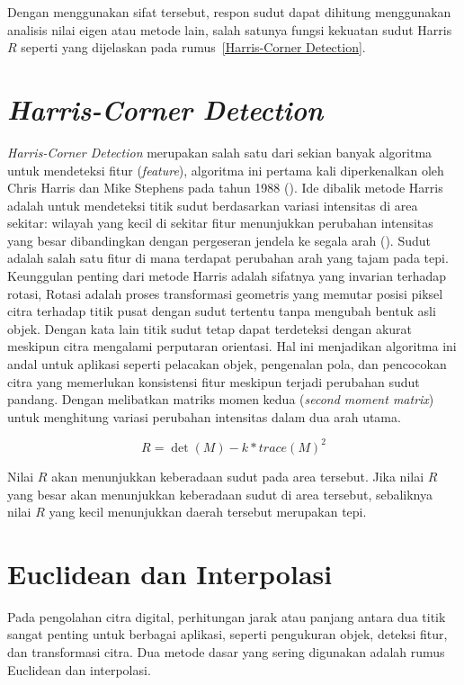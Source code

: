 Dengan menggunakan sifat tersebut, respon sudut dapat dihitung menggunakan analisis nilai eigen atau metode lain, salah satunya fungsi kekuatan sudut Harris \(R\) seperti yang dijelaskan pada rumus~\ref{Harris-Corner Detection}.

\section{\emph{Harris-Corner Detection}}
  \emph{Harris-Corner Detection} merupakan salah satu dari sekian banyak algoritma untuk mendeteksi fitur (\emph{feature}), algoritma ini pertama kali diperkenalkan oleh Chris Harris dan Mike Stephens pada tahun 1988 (\cite{Harris2013}). 
Ide dibalik metode Harris adalah untuk mendeteksi titik sudut berdasarkan variasi intensitas di area sekitar: wilayah yang kecil di sekitar fitur menunjukkan perubahan intensitas yang besar dibandingkan dengan pergeseran jendela ke segala arah (\cite[hlm. 305--308]{Sanchez2018}).
Sudut adalah salah satu fitur di mana terdapat perubahan arah yang tajam pada tepi. Keunggulan penting dari metode Harris adalah sifatnya yang invarian terhadap rotasi, Rotasi adalah proses transformasi geometris yang memutar posisi piksel citra terhadap titik pusat dengan sudut tertentu tanpa mengubah bentuk asli objek. Dengan kata lain titik sudut tetap dapat terdeteksi dengan akurat meskipun citra mengalami perputaran orientasi. Hal ini menjadikan algoritma ini andal untuk aplikasi seperti pelacakan objek, pengenalan pola, dan pencocokan citra yang memerlukan konsistensi fitur meskipun terjadi perubahan sudut pandang. 
Dengan melibatkan matriks momen kedua (\emph{second moment matrix}) untuk menghitung variasi perubahan intensitas dalam dua arah utama.

\begin{equation}
  R = \det(M) - k * {trace(M)}^2
  \label{Harris-Corner Detection}
\end{equation}

  Nilai \(R\) akan menunjukkan keberadaan sudut pada area tersebut. 
Jika nilai \(R\) yang besar akan menunjukkan keberadaan sudut di area tersebut, sebaliknya nilai \(R\) yang kecil menunjukkan daerah tersebut merupakan tepi.

\section{Euclidean dan Interpolasi}
  Pada pengolahan citra digital, perhitungan jarak atau panjang antara dua titik sangat penting untuk berbagai aplikasi, seperti pengukuran objek, deteksi fitur, dan transformasi citra. Dua metode dasar yang sering digunakan adalah rumus Euclidean dan interpolasi.

